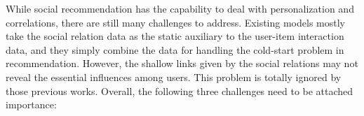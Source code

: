 \documentclass[letterpaper]{article} %
\begin{document}

While social recommendation has the capability to deal with personalization and correlations, there are still many challenges to address. Existing models mostly take the social relation data as the static auxiliary to the user-item interaction data, and they simply combine the data for handling the cold-start problem in recommendation. However, the shallow links given by the social relations may not reveal the essential influences among users. This problem is totally ignored by those previous works.
Overall, the following three challenges need to be attached importance:
\end{document}

